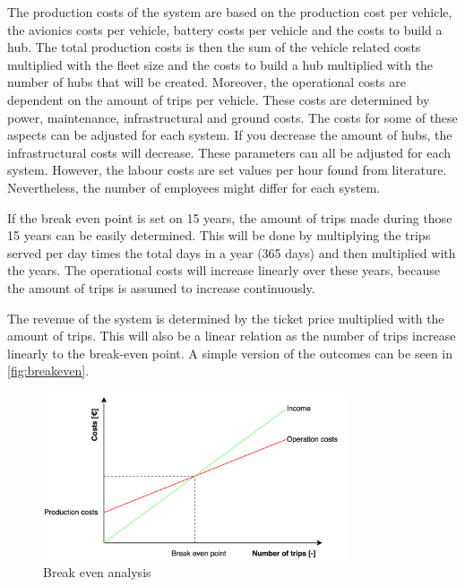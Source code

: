 The production costs of the system are based on the production cost per vehicle, the avionics costs per vehicle, battery costs per vehicle and the costs to build a hub. The total production costs is then the sum of the vehicle related costs multiplied with the fleet size and the costs to build a hub multiplied with the number of hubs that will be created. Moreover, the operational costs are dependent on the amount of trips per vehicle. These costs are determined by power, maintenance, infrastructural and ground costs. The costs for some of these aspects can be adjusted for each system. If you decrease the amount of hubs, the infrastructural costs will decrease. These parameters can all be adjusted for each system. However, the labour costs are set values per hour found from literature. Nevertheless, the number of employees might differ for each system. 

If the break even point is set on 15 years, the amount of trips made during those 15 years can be easily determined. This will be done by multiplying the trips served per day times the total days in a year (365 days) and then multiplied with the years. The operational costs will increase linearly over these years, because the amount of trips is assumed to increase continuously.

The revenue of the system is determined by the ticket price multiplied with the amount of trips. This will also be a linear relation as the number of trips increase linearly to the break-even point. A simple version of the outcomes can be seen in \autoref{fig:breakeven}.

\begin{figure}[H]
    \centering
    \captionsetup{justification=centering}
    \includegraphics[width=0.8\textwidth]{Figures/Ticketprice.png}
    \captionsetup{justification=centering}
    \caption{Break even analysis}
    \label{fig:breakeven}
\end{figure}

